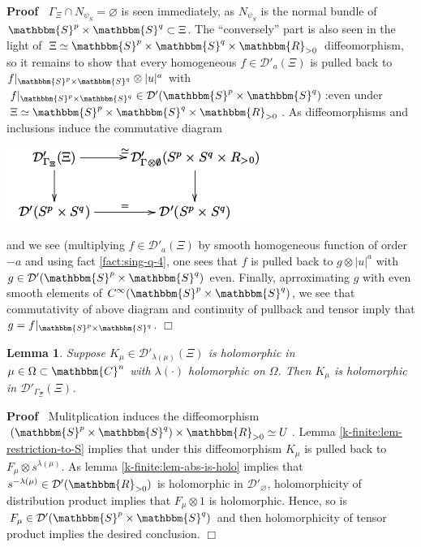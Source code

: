 \documentclass{article}
\newenvironment{proof}{\noindent\textbf{Proof\ }}{\hspace*{\fill}$\Box$\medskip}
\numberwithin{definition}{section}
\newtheorem{lemma}{Lemma}
\numberwithin{lemma}{section}
\numberwithin{proposition}{section}
{\theorembodyfont{\rmfamily}\newtheorem{remark}{Remark}
\numberwithin{remark}{section}
}
\begin{document}
\begin{proof}
  $\Gamma_{\Xi} \cap N_{\psi_S} = \varnothing$ is seen immediately, as
  $N_{\psi_S}$ is the normal bundle of $\mathbbm{S}^p \times \mathbbm{S}^q
  \subset \Xi$. The ``conversely'' part is also seen in the light of $\Xi
  \simeq \mathbbm{S}^p \times \mathbbm{S}^q \times \mathbbm{R}_{> 0}$
  diffeomorphism, so it remains to show that every homogeneous $f \in
  \mathcal{D}'_a ( \Xi)$ is pulled back to $f |_{\mathbbm{S}^p \times
  \mathbbm{S}^q} \otimes | u |^a$ with $f |_{\mathbbm{S}^p \times
  \mathbbm{S}^q} \in \mathcal{D}' ( \mathbbm{S}^p \times \mathbbm{S}^q)$:even
  under $\Xi \simeq \mathbbm{S}^p \times \mathbbm{S}^q \times \mathbbm{R}_{>
  0}$. As diffeomorphisms and inclusions induce the commutative diagram
  \begin{center}
    \includegraphics[scale=0.6]{master_master-5.png}
  \end{center}
  and we see (multiplying $f \in \mathcal{D}'_a ( \Xi)$ by smooth homogeneous
  function of order $- a$ and using fact \ref{fact:sing-q-4}, one sees that
  $f$ is pulled back to $g \otimes | u |^a$ with $g \in \mathcal{D}' (
  \mathbbm{S}^p \times \mathbbm{S}^q)$ even. Finally, aprroximating $g$ with
  even smooth elements of $C^{\infty} ( \mathbbm{S}^p \times \mathbbm{S}^q)$,
  we see that commutativity of above diagram and continuity of pullback and
  tensor imply that $g = f |_{\mathbbm{S}^p \times \mathbbm{S}^q}$.
\end{proof}

\begin{lemma}
  \label{k-finite:lem-holo-easy}Suppose $K_{\mu} \in \mathcal{D}'_{\lambda (
  \mu)} ( \Xi)$ is holomorphic in $\mu \in \Omega \subset \mathbbm{C}^n$ with
  $\lambda ( \cdot)$ holomorphic on $\Omega$. Then $K_{\mu}$ is holomorphic in
  $\mathcal{D}'_{\Gamma_{\Xi}} ( \Xi)$.
\end{lemma}

\begin{proof}
  Mulitplication induces the diffeomorphism $( \mathbbm{S}^p \times
  \mathbbm{S}^q) \times \mathbbm{R}_{> 0} \simeq U$. Lemma
  \ref{k-finite:lem-restriction-to-S} implies that under this diffeomorphism
  $K_{\mu}$ is pulled back to $F_{\mu} \otimes s^{\lambda ( \mu)}$. As lemma
  \ref{k-finite:lem-abs-is-holo} implies that $s^{- \lambda ( \mu)} \in
  \mathcal{D}' ( \mathbbm{R}_{> 0})$ is holomorphic in
  $\mathcal{D}'_{\varnothing}$, holomorphicity of distribution product implies
  that $F_{\mu} \otimes 1$ is holomorphic. Hence, so is $F_{\mu} \in
  \mathcal{D}' ( \mathbbm{S}^p \times \mathbbm{S}^q)$ and then holomorphicity
  of tensor product implies the desired conclusion.
\end{proof}
\end{document}
